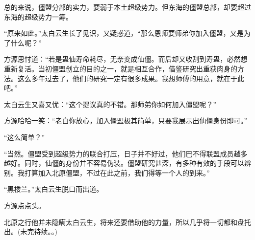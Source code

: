 \begin{this_body}
总的来说，僵盟分部的实力，要弱于本土超级势力。但东海的僵盟总部，却要超过东海的超级势力一筹。

“原来如此。”太白云生长了见识，又疑惑道，“那么恩师要师弟你加入僵盟，又是为了什么呢？”

方源思忖道：“若是蛊仙寿命耗尽，无奈变成仙僵。而后却又收刮到寿蛊，必然想重新复活。当初僵盟创立的目的之一，就是相互合作，借鉴研究出重获肉身的方法。这么多年过去了，他们的研究一定有很多成果。我想师傅的用意，就在于此吧。”

太白云生又喜又忧：“这个提议真的不错。那师弟你如何加入僵盟呢？”

方源哈哈一笑：“老白你放心，加入僵盟极其简单，只要我展示出仙僵身份即可。”

“这么简单？”

“当然。僵盟受到超级势力的联合打压，日子并不好过，他们巴不得联盟成员越多越好。同时，仙僵的身份并不容易伪装。僵盟研究甚深，有多种有效的手段可以辨别。我打算加入北原僵盟，不过在此之前，我们得等一个人的到来。”

“黑楼兰。”太白云生脱口而出道。

方源点点头。

北原之行他并未隐瞒太白云生，将来还要借助他的力量，所以几乎将一切都和盘托出。(未完待续。。)

\end{this_body}

